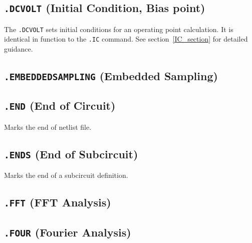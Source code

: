 \newpage
\subsection{\texttt{.DCVOLT} (Initial Condition, Bias point)}

The \texttt{.DCVOLT} sets initial conditions for an operating point calculation.
It is identical in function to the \texttt{.IC} command.  See
section~\ref{IC_section} for detailed guidance.

\newpage
\subsection{\texttt{.EMBEDDEDSAMPLING} (Embedded Sampling)}\label{.EMBEDDEDSAMPLING}


\newpage
\subsection{\texttt{.END} (End of Circuit)}
Marks the end of netlist file.

\newpage
\subsection{\texttt{.ENDS} (End of Subcircuit)}
Marks the end of a subcircuit definition.

\newpage
\subsection{\texttt{.FFT} (FFT Analysis)}


\newpage
\subsection{\texttt{.FOUR} (Fourier Analysis)}


\newpage
